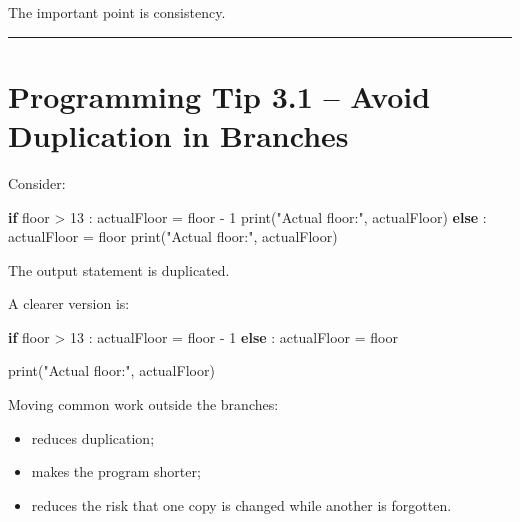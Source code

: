 \documentclass[
  11pt,
  a4paper,
]{article}
\newenvironment{Shaded}{}{}
\newcommand{\BuiltInTok}[1]{\textcolor[rgb]{0.00,0.50,0.00}{#1}}
\newcommand{\ControlFlowTok}[1]{\textcolor[rgb]{0.00,0.44,0.13}{\textbf{#1}}}
\newcommand{\DecValTok}[1]{\textcolor[rgb]{0.25,0.63,0.44}{#1}}
\newcommand{\NormalTok}[1]{#1}
\newcommand{\OperatorTok}[1]{\textcolor[rgb]{0.40,0.40,0.40}{#1}}
\newcommand{\StringTok}[1]{\textcolor[rgb]{0.25,0.44,0.63}{#1}}
\providecommand{\tightlist}{%
  \setlength{\itemsep}{0pt}\setlength{\parskip}{0pt}}
\begin{document}
The important point is consistency.

\begin{center}\rule{0.5\linewidth}{0.5pt}\end{center}

\section{Programming Tip 3.1 -- Avoid Duplication in
Branches}\label{programming-tip-3.1-avoid-duplication-in-branches}

Consider:

\begin{Shaded}
\begin{Highlighting}[]
\ControlFlowTok{if}\NormalTok{ floor }\OperatorTok{\textgreater{}} \DecValTok{13}\NormalTok{ :}
\NormalTok{    actualFloor }\OperatorTok{=}\NormalTok{ floor }\OperatorTok{{-}} \DecValTok{1}
    \BuiltInTok{print}\NormalTok{(}\StringTok{"Actual floor:"}\NormalTok{, actualFloor)}
\ControlFlowTok{else}\NormalTok{ :}
\NormalTok{    actualFloor }\OperatorTok{=}\NormalTok{ floor}
    \BuiltInTok{print}\NormalTok{(}\StringTok{"Actual floor:"}\NormalTok{, actualFloor)}
\end{Highlighting}
\end{Shaded}

The output statement is duplicated.

A clearer version is:

\begin{Shaded}
\begin{Highlighting}[]
\ControlFlowTok{if}\NormalTok{ floor }\OperatorTok{\textgreater{}} \DecValTok{13}\NormalTok{ :}
\NormalTok{    actualFloor }\OperatorTok{=}\NormalTok{ floor }\OperatorTok{{-}} \DecValTok{1}
\ControlFlowTok{else}\NormalTok{ :}
\NormalTok{    actualFloor }\OperatorTok{=}\NormalTok{ floor}

\BuiltInTok{print}\NormalTok{(}\StringTok{"Actual floor:"}\NormalTok{, actualFloor)}
\end{Highlighting}
\end{Shaded}

Moving common work outside the branches:

\begin{itemize}
\tightlist
\item
  reduces duplication;
\item
  makes the program shorter;
\item
  reduces the risk that one copy is changed while another is forgotten.
\end{itemize}
\end{document}
